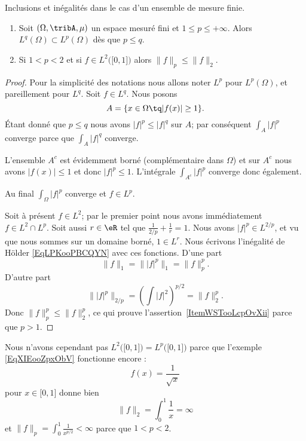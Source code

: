 \begin{proposition} \label{PropIRDooFSWORl}
	Inclusions et inégalités dans le cas d'un ensemble de mesure finie.
	\begin{enumerate}
		\item
		      Soit \( (\Omega,\tribA,\mu)\) un espace mesuré fini et \( 1\leq p\leq +\infty\). Alors \( L^q(\Omega)\subset L^p(\Omega)\) dès que \( p\leq q\).
		\item   \label{ItemWSTooLcpOvXii}
		      Si \( 1<p<2\) et si \( f\in L^2\big( \mathopen[ 0 , 1 \mathclose] \big)\) alors \( \| f \|_p\leq \| f \|_2\).
	\end{enumerate}
\end{proposition}
\begin{proof}
	Pour la simplicité des notations nous allons noter \( L^p\) pour \( L^p(\Omega)\), et pareillement pour \( L^q\). Soit \( f\in L^q\). Nous posons
	\begin{equation}
		A=\{ x\in\Omega\tq | f(x) |\geq 1 \}.
	\end{equation}
	Étant donné que \( p\leq q\) nous avons \( | f |^p\leq | f |^q\) sur \( A\); par conséquent \( \int_A| f |^p\) converge parce que \( \int_A| f |^q\) converge.

	L'ensemble \( A^c\) est évidemment borné (complémentaire dans \(  \Omega \)) et sur \( A^c\) nous avons \( | f(x) |\leq 1\) et donc \( | f |^p\leq 1\). L'intégrale \( \int_{A^c}| f |^p\) converge donc également.

	Au final \( \int_{\Omega}| f |^p\) converge et \( f\in L^p\).


	Soit à présent \( f\in L^2\); par le premier point nous avons immédiatement \( f\in L^2\cap L^p\). Soit aussi \( r\in \eR\) tel que \( \frac{1}{ 2/p }+\frac{1}{ r }=1\). Nous avons \( | f |^p\in L^{2/p}\), et vu que nous sommes sur un domaine borné, \( 1\in L^r\). Nous écrivons l'inégalité de Hölder \eqref{EqLPKooPBCQYN} avec ces fonctions. D'une part
	\begin{equation}
		\| f \|_1=\| | f |^p \|_1=\| f \|_p^p.
	\end{equation}
	D'autre part
	\begin{equation}
		\| | f |^p \|_{2/p}=\left( \int| f |^2 \right)^{p/2}=\| f \|_2^p.
	\end{equation}
	Donc \( \| f \|_p^p\leq \| f \|_2^p\), ce qui prouve l'assertion~\ref{ItemWSTooLcpOvXii} parce que \( p>1\).
\end{proof}

\begin{remark}
	Nous n'avons cependant pas \( L^2\big( \mathopen[ 0 , 1 \mathclose] \big)=L^p\big( \mathopen[ 0 , 1 \mathclose] \big)\) parce que l'exemple \eqref{EqXIEooZpxObV} fonctionne encore :
	\begin{equation}
		f(x)=\frac{1}{ \sqrt{x} }
	\end{equation}
	pour \( x\in\mathopen[ 0 , 1 \mathclose]\) donne bien
	\begin{equation}
		\| f \|_2=\int_0^1\frac{1}{ x }=\infty
	\end{equation}
	et \( \| f \|_p=\int_0^1\frac{1}{ x^{p/2} }<\infty\) parce que \( 1<p<2\).
\end{remark}

